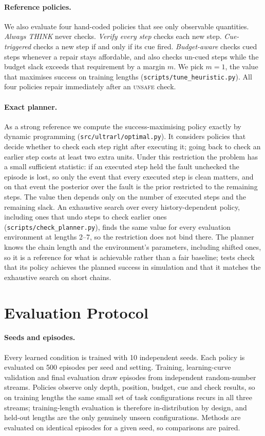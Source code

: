 \paragraph{Reference policies.}
We also evaluate four hand-coded policies that see only observable quantities. \emph{Always THINK} never checks. \emph{Verify every step} checks each new step. \emph{Cue-triggered} checks a new step if and only if its cue fired. \emph{Budget-aware} checks cued steps whenever a repair stays affordable, and also checks un-cued steps while the budget slack exceeds that requirement by a margin $m$. We pick $m{=}1$, the value that maximises success on training lengths (\texttt{scripts/tune\_heuristic.py}). All four policies repair immediately after an \textsc{unsafe} check.

\paragraph{Exact planner.}
As a strong reference we compute the success-maximising policy exactly by dynamic programming (\texttt{src/ultrarl/optimal.py}). It considers policies that decide whether to check each step right after executing it; going back to check an earlier step costs at least two extra units. Under this restriction the problem has a small sufficient statistic: if an executed step held the fault unchecked the episode is lost, so only the event that every executed step is clean matters, and on that event the posterior over the fault is the prior restricted to the remaining steps. The value then depends only on the number of executed steps and the remaining slack. An exhaustive search over every history-dependent policy, including ones that undo steps to check earlier ones (\texttt{scripts/check\_planner.py}), finds the same value for every evaluation environment at lengths 2--7, so the restriction does not bind there. The planner knows the chain length and the environment's parameters, including shifted ones, so it is a reference for what is achievable rather than a fair baseline; tests check that its policy achieves the planned success in simulation and that it matches the exhaustive search on short chains.

\section{Evaluation Protocol}
\label{sec:protocol}

\paragraph{Seeds and episodes.}
Every learned condition is trained with 10 independent seeds. Each policy is evaluated on 500 episodes per seed and setting. Training, learning-curve validation and final evaluation draw episodes from independent random-number streams. Policies observe only depth, position, budget, cue and check results, so on training lengths the same small set of task configurations recurs in all three streams; training-length evaluation is therefore in-distribution by design, and held-out lengths are the only genuinely unseen configurations. Methods are evaluated on identical episodes for a given seed, so comparisons are paired.

